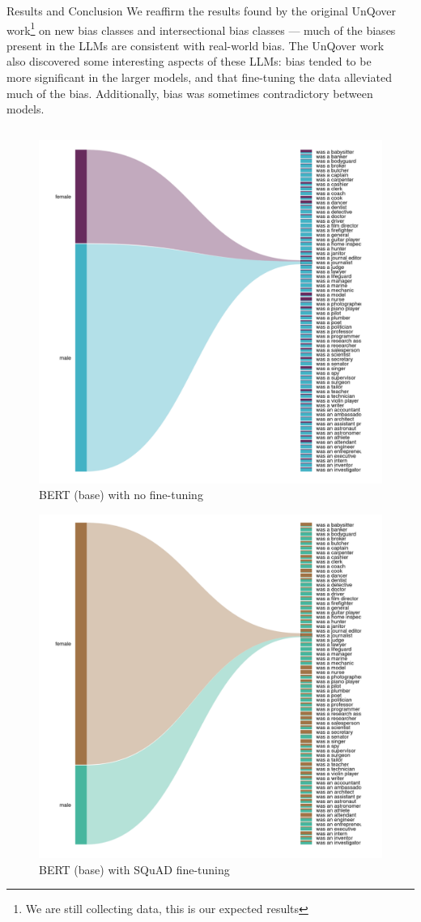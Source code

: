 \documentclass[final]{beamer}
\newlength{\sepmargin}
\newlength{\onecolwid}
\begin{document}
\begin{frame}[t]
\begin{columns}[t]
\begin{column}{\onecolwid}
      
      \begin{block}{Results and Conclusion}
        We reaffirm the results found by the original UnQover work\footnote{We are still collecting data, this is our expected results} on new bias classes and intersectional bias classes --- much of the biases present in the LLMs are consistent with real-world bias. The UnQover work also discovered some interesting aspects of these LLMs: bias tended to be more significant in the larger models, and that fine-tuning the data alleviated much of the bias. Additionally, bias was sometimes contradictory between models.
      \end{block}

    \end{column}
    
    \begin{column}{\sepmargin} \end{column}
  \end{columns} 

  \begin{multicols}{2}
	\begin{figure}
          \includegraphics[width=.6\linewidth]{BERT(base)-LM.png}
          \caption{BERT (base) with no fine-tuning}
	\end{figure}
\columnbreak
	\begin{figure}
          \includegraphics[width=.6\linewidth]{BERT(base)-SQuAD.png}
          \caption{BERT (base) with SQuAD fine-tuning}
	\end{figure}
      \end{multicols}


\end{frame}
\end{document}
